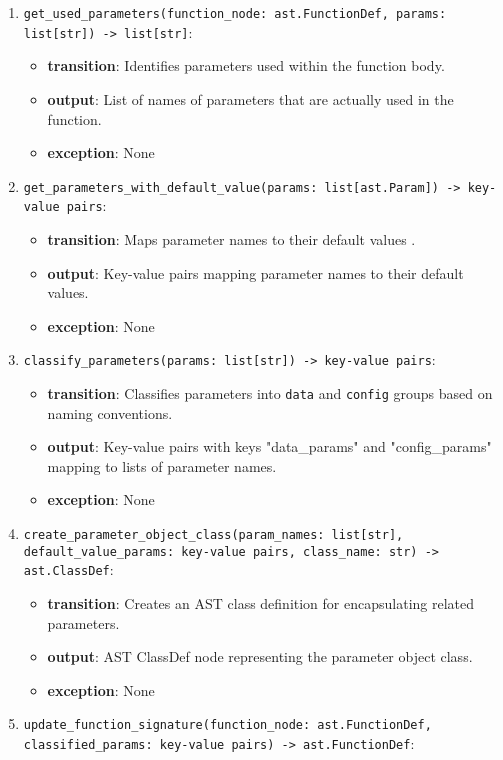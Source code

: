 \documentclass[12pt, titlepage]{article}
\begin{document}
\begin{enumerate}
  \item \texttt{get\_used\_parameters(function\_node: ast.FunctionDef, params: list[str]) -> list[str]}: 
  \begin{itemize}
    \item \textbf{transition}: Identifies parameters used within the function body.
    \item \textbf{output}: List of names of parameters that are actually used in the function.
    \item \textbf{exception}: None
  \end{itemize}
  \item \texttt{get\_parameters\_with\_default\_value(params: list[ast.Param]) -> key-value pairs}: 
  \begin{itemize}
    \item \textbf{transition}: Maps parameter names to their default values .
    \item \textbf{output}: Key-value pairs mapping parameter names to their default values.
    \item \textbf{exception}: None
  \end{itemize}
  \item \texttt{classify\_parameters(params: list[str]) -> key-value pairs}: 
  \begin{itemize}
    \item \textbf{transition}: Classifies parameters into \texttt{data} and \texttt{config} groups based on naming conventions.
    \item \textbf{output}: Key-value pairs with keys "data\_params" and "config\_params" mapping to lists of parameter names.
    \item \textbf{exception}: None
  \end{itemize}
  \item \texttt{create\_parameter\_object\_class(param\_names: list[str], default\_value\_params: key-value pairs, class\_name: str) -> ast.ClassDef}: 
  \begin{itemize}
    \item \textbf{transition}: Creates an AST class definition for encapsulating related parameters.
    \item \textbf{output}: AST ClassDef node representing the parameter object class.
    \item \textbf{exception}: None
  \end{itemize}
  \item \texttt{update\_function\_signature(function\_node: ast.FunctionDef, classified\_params: key-value pairs) -> ast.FunctionDef}:

\end{enumerate}
\end{document}
